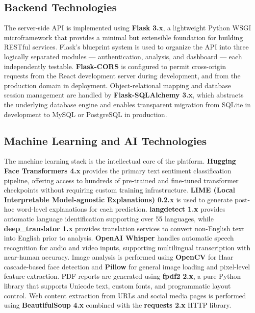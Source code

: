 \documentclass[12pt, a4paper]{report}
\begin{document}
\subsection{Backend Technologies}

The server-side API is implemented using \textbf{Flask 3.x}, a lightweight Python WSGI microframework that provides a minimal but extensible foundation for building RESTful services. Flask's blueprint system is used to organize the API into three logically separated modules --- authentication, analysis, and dashboard --- each independently testable. \textbf{Flask-CORS} is configured to permit cross-origin requests from the React development server during development, and from the production domain in deployment. Object-relational mapping and database session management are handled by \textbf{Flask-SQLAlchemy 3.x}, which abstracts the underlying database engine and enables transparent migration from SQLite in development to MySQL or PostgreSQL in production.

\subsection{Machine Learning and AI Technologies}

The machine learning stack is the intellectual core of the platform. \textbf{Hugging Face Transformers 4.x} provides the primary text sentiment classification pipeline, offering access to hundreds of pre-trained and fine-tuned transformer checkpoints without requiring custom training infrastructure. \textbf{LIME (Local Interpretable Model-agnostic Explanations) 0.2.x} is used to generate post-hoc word-level explanations for each prediction. \textbf{langdetect 1.x} provides automatic language identification supporting over 55 languages, while \textbf{deep\_translator 1.x} provides translation services to convert non-English text into English prior to analysis. \textbf{OpenAI Whisper} handles automatic speech recognition for audio and video inputs, supporting multilingual transcription with near-human accuracy. Image analysis is performed using \textbf{OpenCV} for Haar cascade-based face detection and \textbf{Pillow} for general image loading and pixel-level feature extraction. PDF reports are generated using \textbf{fpdf2 2.x}, a pure-Python library that supports Unicode text, custom fonts, and programmatic layout control. Web content extraction from URLs and social media pages is performed using \textbf{BeautifulSoup 4.x} combined with the \textbf{requests 2.x} HTTP library.
\end{document}
